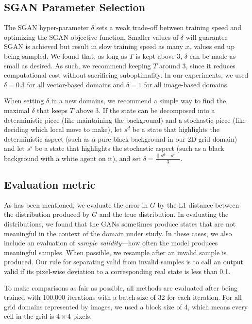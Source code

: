 \documentclass[letterpaper]{article} %
\begin{document}
\subsection{SGAN Parameter Selection}

The SGAN hyper-parameter $\delta$ sets a weak trade-off between training speed and optimizing the SGAN objective function. Smaller values of $\delta$ will guarantee SGAN is achieved but result in slow training speed as many $x_\tau$ values end up being sampled. We found that, as long as $T$ is kept above $3$, $\delta$ can be made as small as desired. As such, we recommend keeping $T$ around $3$, since it reduces computational cost without sacrificing suboptimality. In our experiments, we used $\delta=0.3$ for all vector-based domains and $\delta=1$ for all image-based domains.

When setting $\delta$ in a new domains, we recommend a simple way to find the maximal $\delta$ that keeps $T$ above $3$. If the state can be decomposed into a deterministic piece (like maintaining the background) and a stochastic piece (like deciding which local move to make), let $s^d$ be a state that highlights the deterministic aspect (such as a pure black background in our 2D grid domain) and let $s^s$ be a state that highlights the stochastic aspect (such as a black background with a white agent on it), and set $\delta=\frac{\|s^d-s^s\|}{3}$.

\subsection{Evaluation metric}

As has been mentioned, we evaluate the error in $G$ by the L1 distance between the distribution produced by $G$ and the true distribution.  In evaluating the distributions, we found that the GANs sometimes produce states that are not meaningful in the context of the domain under study. In these cases, we also include an evaluation of \emph{sample validity}---how often the model produces meaningful samples. When possible, we resample after an invalid sample is produced. Our rule for separating valid from invalid samples is to call an output valid if its pixel-wise deviation to a corresponding real state is less than 0.1.

To make comparisons as fair as possible, all methods are evaluated after being trained with 100,000 iterations with a batch size of 32 for each iteration. For all grid domains represented by images, we used a block size of 4, which means every cell in the grid is $4\times4$ pixels.
\end{document}
